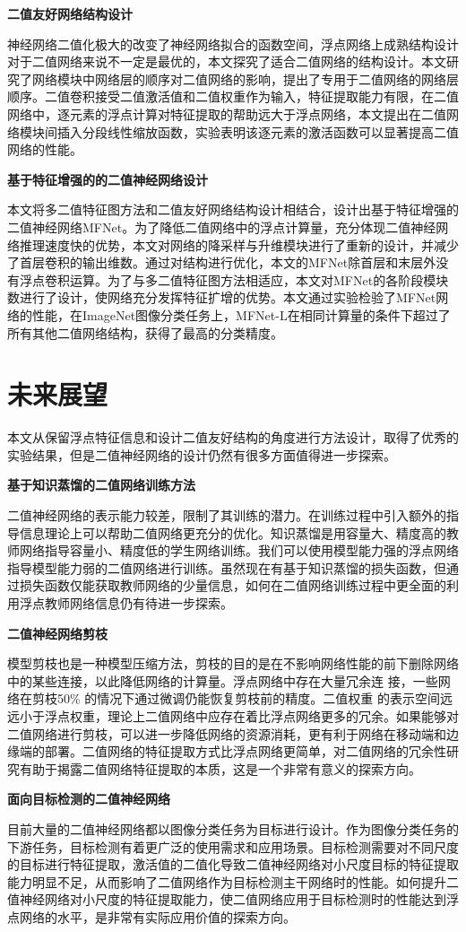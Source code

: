 \textbf{二值友好网络结构设计}

神经网络二值化极大的改变了神经网络拟合的函数空间，浮点网络上成熟结构设计对于二值网络来说不一定是最优的，本文探究了适合二值网络的结构设计。本文研究了网络模块中网络层的顺序对二值网络的影响，提出了专用于二值网络的网络层顺序。二值卷积接受二值激活值和二值权重作为输入，特征提取能力有限，在二值网络中，逐元素的浮点计算对特征提取的帮助远大于浮点网络，本文提出在二值网络模块间插入分段线性缩放函数，实验表明该逐元素的激活函数可以显著提高二值网络的性能。

\textbf{基于特征增强的的二值神经网络设计}

本文将多二值特征图方法和二值友好网络结构设计相结合，设计出基于特征增强的二值神经网络MFNet。为了降低二值网络中的浮点计算量，充分体现二值神经网络推理速度快的优势，本文对网络的降采样与升维模块进行了重新的设计，并减少了首层卷积的输出维数。通过对结构进行优化，本文的MFNet除首层和末层外没有浮点卷积运算。为了与多二值特征图方法相适应，本文对MFNet的各阶段模块数进行了设计，使网络充分发挥特征扩增的优势。本文通过实验检验了MFNet网络的性能，在ImageNet图像分类任务上，MFNet-L在相同计算量的条件下超过了所有其他二值网络结构，获得了最高的分类精度。

\section{未来展望}

本文从保留浮点特征信息和设计二值友好结构的角度进行方法设计，取得了优秀的实验结果，但是二值神经网络的设计仍然有很多方面值得进一步探索。

\textbf{基于知识蒸馏的二值网络训练方法}

二值神经网络的表示能力较差，限制了其训练的潜力。在训练过程中引入额外的指导信息理论上可以帮助二值网络更充分的优化。知识蒸馏是用容量大、精度高的教师网络指导容量小、精度低的学生网络训练。我们可以使用模型能力强的浮点网络指导模型能力弱的二值网络进行训练。虽然现在有基于知识蒸馏的损失函数，但通过损失函数仅能获取教师网络的少量信息，如何在二值网络训练过程中更全面的利用浮点教师网络信息仍有待进一步探索。

\textbf{二值神经网络剪枝}

模型剪枝也是一种模型压缩方法，剪枝的目的是在不影响网络性能的前下删除网络中的某些连接，以此降低网络的计算量。浮点网络中存在大量冗余连
接，一些网络在剪枝50\% 的情况下通过微调仍能恢复剪枝前的精度。二值权重
的表示空间远远小于浮点权重，理论上二值网络中应存在着比浮点网络更多的冗余。如果能够对二值网络进行剪枝，可以进一步降低网络的资源消耗，更有利于网络在移动端和边缘端的部署。二值网络的特征提取方式比浮点网络更简单，对二值网络的冗余性研究有助于揭露二值网络特征提取的本质，这是一个非常有意义的探索方向。

\textbf{面向目标检测的二值神经网络}

目前大量的二值神经网络都以图像分类任务为目标进行设计。作为图像分类任务的下游任务，目标检测有着更广泛的使用需求和应用场景。目标检测需要对不同尺度的目标进行特征提取，激活值的二值化导致二值神经网络对小尺度目标的特征提取能力明显不足，从而影响了二值网络作为目标检测主干网络时的性能。如何提升二值神经网络对小尺度的特征提取能力，使二值网络应用于目标检测时的性能达到浮点网络的水平，是非常有实际应用价值的探索方向。
